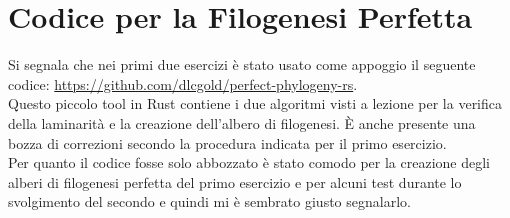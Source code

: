 \documentclass[a4paper,12pt, oneside]{book}
\begin{document}
\chapter{Codice per la Filogenesi Perfetta}
Si segnala che nei primi due esercizi è stato usato come appoggio il seguente
codice: \url{https://github.com/dlcgold/perfect-phylogeny-rs}.\\
Questo piccolo tool in Rust contiene i due algoritmi visti a lezione per la
verifica della laminarità e la creazione dell'albero di filogenesi. È anche
presente una bozza di correzioni secondo la procedura indicata per il primo
esercizio.\\ 
Per quanto il codice fosse solo abbozzato è stato comodo per la creazione degli
alberi di filogenesi perfetta del primo esercizio e per alcuni test durante lo
svolgimento del secondo e quindi mi è sembrato giusto segnalarlo. 
\end{document}
